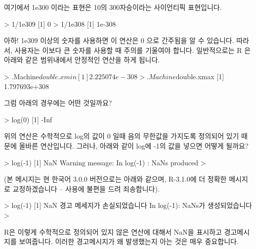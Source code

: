 여기에서 1e300 이라는 표현은 10의 300자승이라는 사이언티픽 표현입니다. 

\begin{Schunk}
\begin{Soutput}
> 1/1e309
[1] 0
> 1/1e308
[1] 1e-308
\end{Soutput}
\end{Schunk}

아하! 1e309 이상의 숫자를 사용하면 이 연산은 0 으로 간주됨을 알 수 있습니다. 
따라서, 사용자는 이보다 큰 숫자를 사용할 때 주의를 기울여야 합니다. 
일반적으로는 R 은 아래와 같은 범위내에서 안정적인 연산을 하게 됩니다. 

\begin{Schunk}
\begin{Soutput}
> .Machine$double.xmin
[1] 2.225074e-308
> .Machine$double.xmax
[1] 1.797693e+308
\end{Soutput}
\end{Schunk}

그럼 아래의 경우에는 어떤 것일까요?

\begin{Schunk}
\begin{Soutput}
> log(0)
[1] -Inf
\end{Soutput}
\end{Schunk}

위의 연산은 수학적으로 log의 값이 0 일때 음의 무한값을 가지도록 정의되어 있기 때문에 올바른 연산입니다. 
그러나, 아래와 같이 log에 -1의 값을 넣으면 어떻게 될까요?

\begin{Schunk}
\begin{Soutput}
> log(-1)
[1] NaN
Warning message:
In log(-1) : NaNs produced
>
\end{Soutput}
\end{Schunk}

(본 메시지는 현 한국어 3.0.0 버전으로는 아래와 같으며, R-3.1.0에 더 정확한 메시지로 교정하겠습니다 -- 사용에 불편을 드려 죄송합니다).

\begin{Schunk}
\begin{Soutput}
> log(-1)
[1] NaN
경고 메세지가 손실되었습니다
In log(-1): NaNs가 생성되었습니다
>
\end{Soutput}
\end{Schunk}

R은 이렇게 수학적으로 정의되어 있지 않은 연산에 대해서 NaN을 표시하고 경고메시지를 보여줍니다. 
이러한 경고메시지가 왜 발생했는지 아는 것은 매우 중요합니다. 

